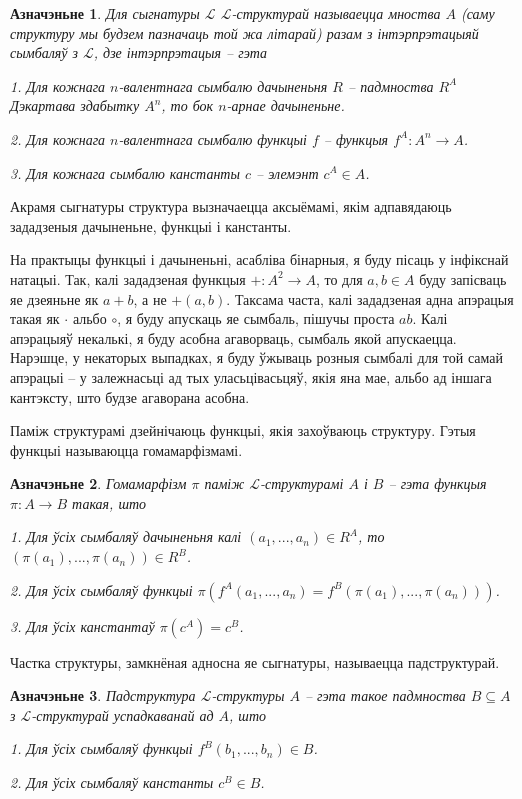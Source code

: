 \documentclass[a4paper,12pt]{book}
\newtheorem{definition}{Азначэньне}[section]
\begin{document}
\begin{definition}
  Для сыгнатуры $\mathcal{L}$ $\mathcal{L}$-структурай называецца
  мноства $A$ (саму структуру мы будзем пазначаць той жа літарай)
  разам з інтэрпрэтацыяй сымбаляў з $\mathcal{L}$, дзе
  інтэрпрэтацыя -- гэта

  1. Для кожнага $n$-валентнага сымбалю дачыненьня $R$ -- падмноства
  $R^{A}$ Дэкартава здабытку $A^n$, то бок $n$-арнае дачыненьне.

  2. Для кожнага $n$-валентнага сымбалю функцыі $f$ -- функцыя $f^A:
  A^n \rightarrow A$.

  3. Для кожнага сымбалю канстанты $c$ -- элемэнт $c^A \in A$.
\end{definition}

Акрамя сыгнатуры структура вызначаецца аксыёмамі, якім адпавядаюць
зададзеныя дачыненьне, функцыі і канстанты.

На практыцы функцыі і дачыненьні, асабліва бінарныя, я буду пісаць
у інфікснай натацыі. Так, калі зададзеная функцыя $+: A^2 \rightarrow
A$, то для $a, b \in A$ буду запісваць яе дзеяньне як $a + b$, а
не $+(a, b)$. Таксама часта, калі зададзеная адна апэрацыя такая як
$\cdot$ альбо $\circ$, я буду апускаць яе сымбаль, пішучы проста
$ab$. Калі апэрацыяў некалькі, я буду асобна агаворваць, сымбаль
якой апускаецца. Нарэшце, у некаторых выпадках, я буду ўжываць розныя
сымбалі для той самай апэрацыі -- у залежнасьці ад тых уласьцівасьцяў,
якія яна мае, альбо ад іншага кантэксту, што будзе агаворана асобна.

Паміж структурамі дзейнічаюць функцыі, якія захоўваюць
структуру. Гэтыя функцыі называюцца гомамарфізмамі.

\begin{definition}
  Гомамарфізм $\pi$ паміж $\mathcal{L}$-структурамі $A$ і $B$ -- гэта
  функцыя $\pi: A \rightarrow B$ такая, што

  1. Для ўсіх сымбаляў дачыненьня калі $(a_1, ..., a_n) \in R^A$, то
  $(\pi(a_1), ..., \pi(a_n)) \in R^B$.

  2. Для ўсіх сымбаляў функцыі $\pi(f^A(a_1, ..., a_n) = f^B(\pi(a_1),
  ..., \pi(a_n)))$.

  3. Для ўсіх канстантаў $\pi(c^A) = c^B$.
\end{definition}

Частка структуры, замкнёная адносна яе сыгнатуры, называецца
падструктурай.

\begin{definition}
  Падструктура $\mathcal{L}$-структуры $A$ -- гэта такое падмноства $B
  \subseteq A$ з $\mathcal{L}$-структурай успадкаванай ад $A$, што

  1. Для ўсіх сымбаляў функцыі $f^B(b_1, ..., b_n) \in B$.

  2. Для ўсіх сымбаляў канстанты $c^B \in B$.
\end{definition}
\end{document}
